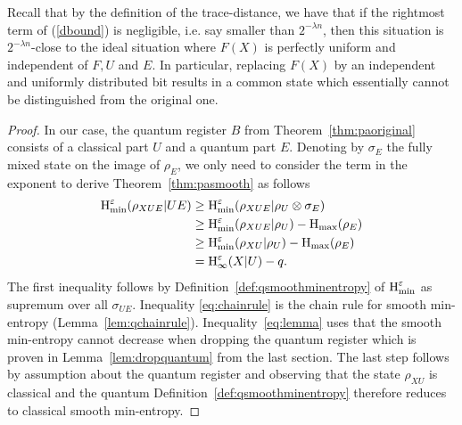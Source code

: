 \documentclass[final,11pt,a4paper]{report}
\newtheorem{corollary}[theorem]{Corollary}
\newcommand*{\comment}[1]{\textsf{[#1]}}
\renewcommand*{\H}{\operatorname{H}}   %
\newcommand*{\hmin}{\ensuremath{\H_{\infty}}}
\newcommand*{\hie}[2]{\ensuremath{\hmin^{#1}(#2)}}
\newcommand*{\hiee}[1]{\hie{\varepsilon}{#1}}
\newcommand*{\qhmin}{\ensuremath{\H_{\rm min}}}  %
\newcommand*{\qhmax}{\ensuremath{\H_{\rm max}}}  %
\newcommand*{\hminee}{\qhmin^{\varepsilon}} %
\newcommand*{\dist}[1]{\delta\big(#1\big)}  %
\newcommand*{\regE}{E}
\newcommand*{\rs}{\regE}
\begin{document}
Recall that by the definition of the trace-distance, we have that
if the rightmost term of (\ref{dbound}) is negligible, i.e.  say
smaller than $2^{-\lambda n}$, then this situation is $2^{-\lambda
  n}$-close to the ideal situation where $F(X)$ is perfectly uniform
and independent of $F, U$ and $\regE$. In particular, replacing $F(X)$
by an independent and uniformly distributed bit results in a common
state which essentially cannot be distinguished from the original one.


\begin{proof}
In our case, the quantum register
$B$ from Theorem~\ref{thm:paoriginal} consists of a classical part $U$ and a
quantum part $E$. Denoting by $\sigma_E$ the fully mixed state on
the image of $\rho_E$, we only need to consider the term in the
exponent to derive Theorem~\ref{thm:pasmooth} as follows
\begin{align}
 \hminee(\rho_{XUE} | UE) \nonumber &\geq \hminee(\rho_{XUE} |
  \rho_{U} \otimes \sigma_E) \nonumber\\
&\geq \hminee(\rho_{XUE} | \rho_{U}) - \qhmax(\rho_{E}) \label{eq:chainrule}\\
&\geq \hminee(\rho_{XU} | \rho_U) - \qhmax(\rho_{E}) \label{eq:lemma}\\
&= \hiee{X | U} - q. \nonumber
\end{align}
The first inequality follows by Definition~\ref{def:qsmoothminentropy}
of $\hminee$ as supremum over all $\sigma_{UE}$. Inequality
\eqref{eq:chainrule} is the chain rule for smooth min-entropy
(Lemma~\ref{lem:qchainrule}). Inequality~\eqref{eq:lemma} uses
that the smooth min-entropy cannot decrease when dropping the quantum
register which is proven in Lemma~\ref{lem:dropquantum} from the last
section. The last step follows by assumption about the quantum
register and observing that the state $\rho_{XU}$
is classical and the quantum Definition~\ref{def:qsmoothminentropy}
therefore reduces to classical smooth min-entropy.
\end{proof}



\end{document}
